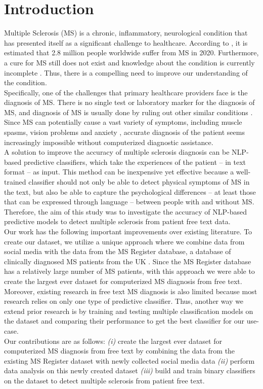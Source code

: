 \documentclass[11pt,a4paper]{article}
\begin{document}
\section{Introduction}
Multiple Sclerosis (MS) is a chronic, inflammatory, neurological condition that has presented itself as a significant challenge to healthcare. According to \citet{Walton:20}, it is estimated that 2.8 million people worldwide suffer from MS in 2020. Furthermore, a cure for MS still does not exist and knowledge about the condition is currently incomplete \citep{Bebo:22}. Thus, there is a compelling need to improve our understanding of the condition. \\
\indent Specifically, one of the challenges that primary healthcare providers face is the diagnosis of MS. There is no single test or laboratory marker for the diagnosis of MS, and diagnosis of MS is usually done by ruling out other similar conditions \citep{Omerhoca:18}. Since MS can potentially cause a vast variety of symptoms, including muscle spasms, vision problems and anxiety \citep{Ghasemi:17}, accurate diagnosis of the patient seems increasingly impossible without computerized diagnostic assistance. \\
\indent A solution to improve the accuracy of multiple sclerosis diagnosis can be NLP-based predictive classifiers, which take the experiences of the patient – in text format – as input. This method can be inexpensive yet effective because a well-trained classifier should not only be able to detect physical symptoms of MS in the text, but also be able to capture the psychological differences – at least those that can be expressed through language – between people with and without MS. Therefore, the aim of this study was to investigate the accuracy of NLP-based predictive models to detect multiple sclerosis from patient free text data. \\
\indent Our work has the following important improvements over existing literature. To create our dataset, we utilize a unique approach where we combine data from social media with the data from the MS Register database, a database of clinically diagnosed MS patients from the UK \citep{Ford:12}. Since the MS Register database has a relatively large number of MS patients, with this approach we were able to create the largest ever dataset for computerized MS diagnosis from free text. Moreover, existing research in free text MS diagnosis is also limited because most research relies on only one type of predictive classifier. Thus, another way we extend prior research is by training and testing multiple classification models on the dataset and comparing their performance to get the best classifier for our use-case. \\
\indent Our contributions are as follows: \emph{(i)} create the largest ever dataset for computerized MS diagnosis from free text by combining the data from the existing MS Register dataset with newly collected social media data \emph{(ii)} perform data analysis on this newly created dataset \emph{(iii)} build and train binary classifiers on the dataset to detect multiple sclerosis from patient free text.
\end{document}
